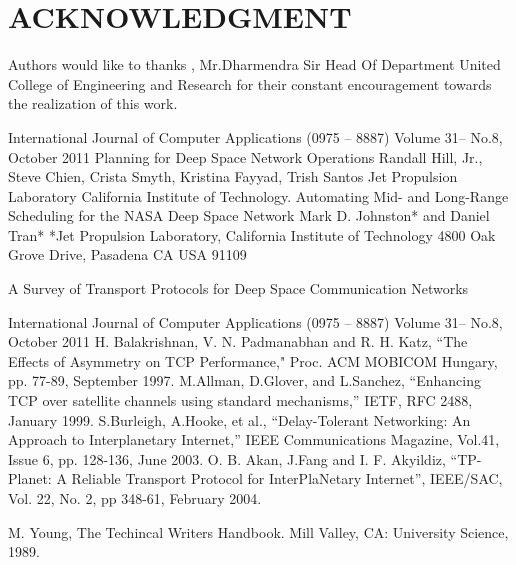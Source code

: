 \documentclass[letterpaper, 10 pt, conference]{ieeeconf}  %
\begin{document}


\section*{ACKNOWLEDGMENT}

Authors would like to thanks ,  Mr.Dharmendra Sir  Head Of Department  United College of Engineering and Research  for their constant encouragement towards the realization of this work.






\begin{thebibliography}{99}

 International Journal of Computer Applications (0975 – 8887)
Volume 31– No.8, October 2011
 Planning for Deep Space Network Operations
Randall Hill, Jr., Steve Chien, Crista Smyth, Kristina Fayyad, Trish Santos
Jet Propulsion Laboratory
California Institute of Technology.
 Automating Mid- and Long-Range Scheduling for the NASA Deep Space Network
Mark D. Johnston* and Daniel Tran*
*Jet Propulsion Laboratory, California Institute of Technology
4800 Oak Grove Drive, Pasadena CA USA 91109

 A Survey of Transport Protocols for Deep Space
Communication Networks

International Journal of Computer Applications (0975 – 8887)
Volume 31– No.8, October 2011
 H. Balakrishnan, V. N. Padmanabhan and R. H. Katz, “The Effects of Asymmetry on TCP Performance," Proc. ACM MOBICOM Hungary, pp. 77-89, September 1997.
 M.Allman, D.Glover, and L.Sanchez, “Enhancing TCP over satellite channels using standard mechanisms,” IETF, RFC 2488, January 1999.
S.Burleigh, A.Hooke, et al., “Delay-Tolerant Networking: An Approach to Interplanetary Internet,” IEEE Communications Magazine, Vol.41, Issue 6, pp. 128-136, June 2003.
 O. B. Akan, J.Fang and I. F. Akyildiz, “TP-Planet: A Reliable Transport Protocol for InterPlaNetary Internet”, IEEE/SAC, Vol. 22, No. 2, pp 348-61, February 2004.


  M. Young, The Techincal Writers Handbook. Mill Valley, CA: University
Science, 1989.







\end{thebibliography}
\end{document}
